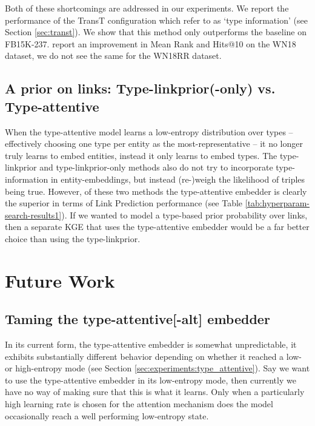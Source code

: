 Both of these shortcomings are addressed in our experiments. We report the performance of the TransT configuration which \citeauthor{ma2017transt} refer to as `type information' (see Section \ref{sec:transt}).
We show that this method only outperforms the baseline on FB15K-237.
\citeauthor{ma2017transt} report an improvement in Mean Rank and Hits@10 on the WN18 dataset, we do not see the same for the WN18RR dataset.


\subsection{A prior on links: Type-linkprior(-only) vs. Type-attentive}

When the type-attentive model learns a low-entropy distribution over types -- effectively choosing one type per entity as the most-representative -- it no longer truly learns to embed entities, instead it only learns to embed types.
%
The type-linkprior and type-linkprior-only methods also do not try to incorporate type-information in entity-embeddings, but instead (re-)weigh the likelihood of triples being true.
%
However, of these two methods the type-attentive embedder is clearly the superior in terms of Link Prediction performance (see Table \ref{tab:hyperparam-search-results1}). If we wanted to model a type-based prior probability over links, then a separate KGE that uses the type-attentive embedder would be a far better choice than using the type-linkprior. 


\section*{Future Work}

\subsection{Taming the type-attentive[-alt] embedder}

In its current form, the type-attentive embedder is somewhat unpredictable, it exhibits substantially different behavior depending on whether it reached a low- or high-entropy mode (see Section \ref{sec:experiments:type_attentive}).
Say we want to use the type-attentive embedder in its low-entropy mode, then currently we have no way of making sure that this is what it learns.
Only when a particularly high learning rate is chosen for the attention mechanism does the model occasionally reach a well performing low-entropy state. 

